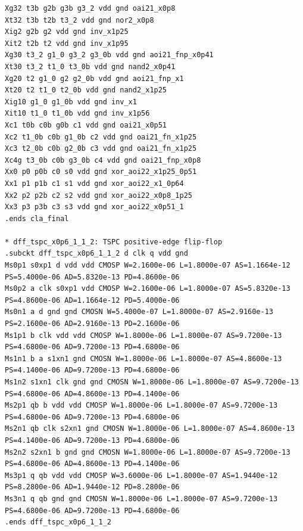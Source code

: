 \documentclass[10pt,a4paper]{article}
\begin{document}
{\begin{verbatim}
Xg32 t3b g2b g3b g3_2 vdd gnd oai21_x0p8
Xt32 t3b t2b t3_2 vdd gnd nor2_x0p8
Xig2 g2b g2 vdd gnd inv_x1p25
Xit2 t2b t2 vdd gnd inv_x1p95
Xg30 t3_2 g1_0 g3_2 g3_0b vdd gnd aoi21_fnp_x0p41
Xt30 t3_2 t1_0 t3_0b vdd gnd nand2_x0p41
Xg20 t2 g1_0 g2 g2_0b vdd gnd aoi21_fnp_x1
Xt20 t2 t1_0 t2_0b vdd gnd nand2_x1p25
Xig10 g1_0 g1_0b vdd gnd inv_x1
Xit10 t1_0 t1_0b vdd gnd inv_x1p56
Xc1 t0b c0b g0b c1 vdd gnd oai21_x0p51
Xc2 t1_0b c0b g1_0b c2 vdd gnd oai21_fn_x1p25
Xc3 t2_0b c0b g2_0b c3 vdd gnd oai21_fn_x1p25
Xc4g t3_0b c0b g3_0b c4 vdd gnd oai21_fnp_x0p8
Xx0 p0 p0b c0 s0 vdd gnd xor_aoi22_x1p25_0p51
Xx1 p1 p1b c1 s1 vdd gnd xor_aoi22_x1_0p64
Xx2 p2 p2b c2 s2 vdd gnd xor_aoi22_x0p8_1p25
Xx3 p3 p3b c3 s3 vdd gnd xor_aoi22_x0p51_1
.ends cla_final

* dff_tspc_x0p6_1_1_2: TSPC positive-edge flip-flop
.subckt dff_tspc_x0p6_1_1_2 d clk q vdd gnd
Ms0p1 s0xp1 d vdd vdd CMOSP W=2.1600e-06 L=1.8000e-07 AS=1.1664e-12 PS=5.4000e-06 AD=5.8320e-13 PD=4.8600e-06
Ms0p2 a clk s0xp1 vdd CMOSP W=2.1600e-06 L=1.8000e-07 AS=5.8320e-13 PS=4.8600e-06 AD=1.1664e-12 PD=5.4000e-06
Ms0n1 a d gnd gnd CMOSN W=5.4000e-07 L=1.8000e-07 AS=2.9160e-13 PS=2.1600e-06 AD=2.9160e-13 PD=2.1600e-06
Ms1p1 b clk vdd vdd CMOSP W=1.8000e-06 L=1.8000e-07 AS=9.7200e-13 PS=4.6800e-06 AD=9.7200e-13 PD=4.6800e-06
Ms1n1 b a s1xn1 gnd CMOSN W=1.8000e-06 L=1.8000e-07 AS=4.8600e-13 PS=4.1400e-06 AD=9.7200e-13 PD=4.6800e-06
Ms1n2 s1xn1 clk gnd gnd CMOSN W=1.8000e-06 L=1.8000e-07 AS=9.7200e-13 PS=4.6800e-06 AD=4.8600e-13 PD=4.1400e-06
Ms2p1 qb b vdd vdd CMOSP W=1.8000e-06 L=1.8000e-07 AS=9.7200e-13 PS=4.6800e-06 AD=9.7200e-13 PD=4.6800e-06
Ms2n1 qb clk s2xn1 gnd CMOSN W=1.8000e-06 L=1.8000e-07 AS=4.8600e-13 PS=4.1400e-06 AD=9.7200e-13 PD=4.6800e-06
Ms2n2 s2xn1 b gnd gnd CMOSN W=1.8000e-06 L=1.8000e-07 AS=9.7200e-13 PS=4.6800e-06 AD=4.8600e-13 PD=4.1400e-06
Ms3p1 q qb vdd vdd CMOSP W=3.6000e-06 L=1.8000e-07 AS=1.9440e-12 PS=8.2800e-06 AD=1.9440e-12 PD=8.2800e-06
Ms3n1 q qb gnd gnd CMOSN W=1.8000e-06 L=1.8000e-07 AS=9.7200e-13 PS=4.6800e-06 AD=9.7200e-13 PD=4.6800e-06
.ends dff_tspc_x0p6_1_1_2
\end{verbatim}
}
\end{document}
